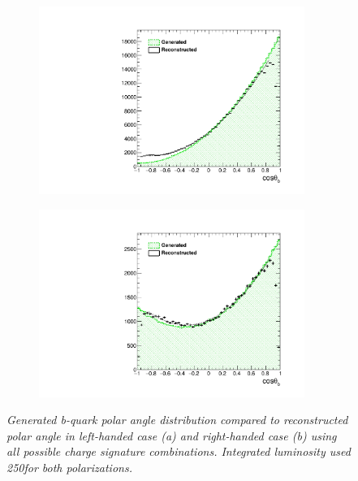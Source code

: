 \begin{figure}
	\centering
	\begin{subfigure}{0.5\textwidth}
		\includegraphics[width=0.95\textwidth]{ILD/plots/basymmetry-norec-nocorr-nobkg-left.pdf}
		\caption{\label{fig:BAsymmetryFirst_a_3} }
	\end{subfigure}%
	\begin{subfigure}{0.5\textwidth}
		\centering
		\includegraphics[width=0.95\textwidth]{ILD/plots/basymmetry-norec-nocorr-nobkg-right.pdf}
		\caption{\label{fig:BAsymmetryFirst_b_3} }
	\end{subfigure}
	\caption{\sl Generated b-quark polar angle distribution compared to reconstructed polar angle in left-handed case (a) and right-handed case (b) using all possible charge signature combinations. Integrated luminosity used 250\ifb for both polarizations. }
	\label{fig:BAsymmetryFirst_3}
\end{figure}
